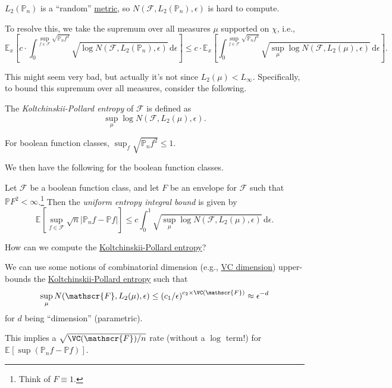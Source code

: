 \begin{problem*}
	\(L_2(\mathbb{P} _n)\) is a ``random'' \hyperref[def:pseudo-metric]{metric}, so \(N(\mathscr{F} , L_2(\mathbb{P} _n), \epsilon )\) is hard to compute.
\end{problem*}
\begin{answer}
	To resolve this, we take the supremum over all measures \(\mu \) supported on \(\chi \), i.e.,
	\[
		\mathbb{E}_{x}\left[ c\cdot \int_{0}^{\sup\limits_{f\in \mathscr{F} } \sqrt{\mathbb{P} _n f^2} } \sqrt{\log N(\mathscr{F} , L_2(\mathbb{P} _n), \epsilon )} \,\mathrm{d}\epsilon \right]
		\leq c\cdot \mathbb{E}_{x}\left[\int_{0}^{\sup\limits_{f\in \mathscr{F} } \sqrt{\mathbb{P} _n f^2} } \sqrt{\sup _\mu \log N(\mathscr{F} , L_2(\mu ), \epsilon )} \,\mathrm{d}\epsilon \right].
	\]
\end{answer}

This might seem very bad, but actually it's not since \(L_2(\mu ) < L_\infty\). Specifically, to bound this supremum over all measures, consider the following.

\begin{definition}\label{def:Koltchinskii-Pollard-entropy}
	The \emph{Koltchinskii-Pollard entropy} of \(\mathscr{F} \) is defined as
	\[
		\sup _{\mu } \log N(\mathscr{F} , L_2(\mu ), \epsilon ).
	\]
\end{definition}

\begin{eg}
	For boolean function classes, \(\sup _f \sqrt{\mathbb{P} _n f^2} \leq 1\).
\end{eg}

We then have the following for the boolean function classes.

\begin{theorem}\label{thm:uniform-entropy-integral-bound}
	Let \(\mathscr{F} \) be a boolean function class, and let \(F\) be an envelope for \(\mathscr{F} \) such that \(\mathbb{P} F^2 < \infty \).\footnote{Think of \(F \equiv 1\).} Then the \emph{uniform entropy integral bound} is given by
	\[
		\mathbb{E}_{}\left[\sup _{f\in \mathscr{F} } \sqrt{n} \vert \mathbb{P} _n f - \mathbb{P} f \vert  \right]
		\leq c \int_{0}^{1} \sqrt{\sup _\mu \log N(\mathscr{F} , L_2(\mu ), \epsilon )}  \,\mathrm{d}\epsilon.
	\]
\end{theorem}

\begin{problem*}
	How can we compute the \hyperref[def:Koltchinskii-Pollard-entropy]{Koltchinskii-Pollard entropy}?
\end{problem*}
\begin{answer}
	We can use some notions of combinatorial dimension (e.g., \hyperref[def:VC-dimension]{VC dimension}) upper-bounds the \hyperref[def:Koltchinskii-Pollard-entropy]{Koltchinskii-Pollard entropy} such that
	\[
		\sup _\mu N(\mathscr{F} , L_2(\mu ), \epsilon )
		\leq \left( c_1 / \epsilon \right) ^{c_2 \times \VC(\mathscr{F} )}
		\approx \epsilon ^{-d}
	\]
	for \(d\) being ``dimension'' (parametric).
\end{answer}

\begin{remark}
	This implies a \(\sqrt{\VC(\mathscr{F} ) / n} \) rate (without a \(\log \) term!) for \(\mathbb{E}_{}\left[\sup (\mathbb{P} _n f - \mathbb{P} f) \right] \).
\end{remark}